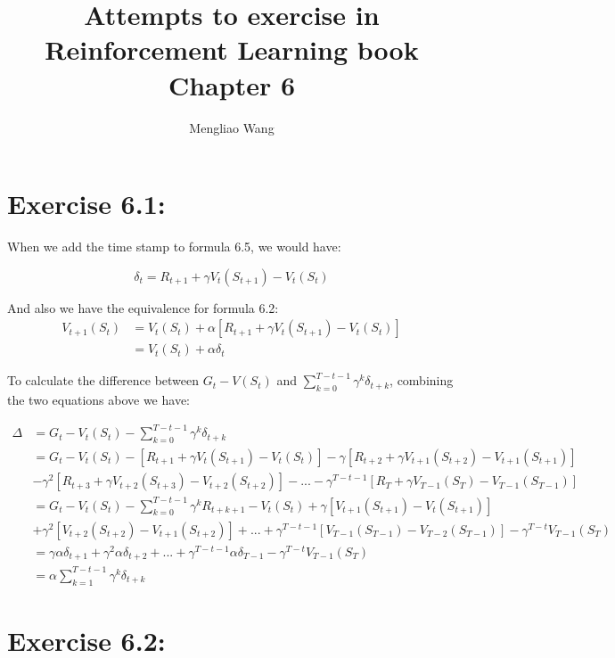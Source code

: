 \documentclass[10pt,letterpaper]{article}
\title{Attempts to exercise in Reinforcement Learning book Chapter 6}
\author{Mengliao Wang}
\begin{document}
\maketitle



\section*{Exercise 6.1: }
\label{6.1}

When we add the time stamp to formula 6.5, we would have:

\begin{equation*}
\delta_t = R_{t+1} + \gamma V_t(S_{t+1}) - V_t(S_t)
\end{equation*}

And also we have the equivalence for formula 6.2:
\begin{align*}
V_{t+1}(S_t) &= V_t(S_t) + \alpha\left[R_{t+1} + \gamma V_t(S_{t+1}) - V_t(S_t)\right]\\
&= V_t(S_t) + \alpha\delta_t
\end{align*}

To calculate the difference between $G_t-V(S_t)$ and $\sum_{k=0}^{T-t-1}\gamma^k\delta_{t+k}$, combining the two equations above we have:

\begin{align*}
\Delta &= G_t-V_t(S_t) - \sum_{k=0}^{T-t-1}\gamma^k\delta_{t+k} \\
&= G_t-V_t(S_t) - [R_{t+1} + \gamma V_t(S_{t+1}) - V_t(S_t)] - \gamma[R_{t+2} + \gamma V_{t+1}(S_{t+2}) - V_{t+1}(S_{t+1})] \\
& - \gamma^2[R_{t+3} + \gamma V_{t+2}(S_{t+3}) - V_{t+2}(S_{t+2})] - ... - \gamma^{T-t-1}[R_{T} + \gamma V_{T-1}(S_{T}) - V_{T-1}(S_{T-1})]\\
&= G_t-V_t(S_t) - \sum_{k=0}^{T-t-1}\gamma^kR_{t+k+1} -V_t(S_t) + \gamma[V_{t+1}(S_{t+1}) - V_t(S_{t+1})] \\
& + \gamma^2[V_{t+2}(S_{t+2}) - V_{t+1}(S_{t+2})] + ... + \gamma^{T-t-1}[V_{T-1}(S_{T-1}) - V_{T-2}(S_{T-1})] - \gamma^{T-t}V_{T-1}(S_T)\\
&= \gamma\alpha\delta_{t+1} + \gamma^2\alpha\delta_{t+2} + ... + \gamma^{T-t-1}\alpha\delta_{T-1} - \gamma^{T-t}V_{T-1}(S_T)\\
&= \alpha\sum_{k=1}^{T-t-1}\gamma^{k}\delta_{t+k}
\end{align*}

\section*{Exercise 6.2: }
\label{6.2}
\end{document}
